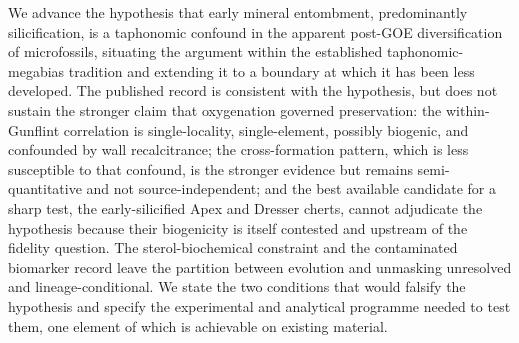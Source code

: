\documentclass[11pt]{article}
\begin{document}
We advance the hypothesis that early mineral entombment, predominantly silicification, is a
taphonomic confound in the apparent post-GOE diversification of microfossils, situating the argument
within the established taphonomic-megabias tradition and extending it to a boundary at which it has
been less developed. The published record is consistent with the hypothesis, but does not sustain the
stronger claim that oxygenation governed preservation: the within-Gunflint correlation is
single-locality, single-element, possibly biogenic, and confounded by wall recalcitrance; the
cross-formation pattern, which is less susceptible to that confound, is the stronger evidence but
remains semi-quantitative and not source-independent; and the best available candidate for a sharp
test, the early-silicified Apex and Dresser cherts, cannot adjudicate the hypothesis because their
biogenicity is itself contested and upstream of the fidelity question. The sterol-biochemical
constraint and the contaminated biomarker record leave the partition between evolution and unmasking
unresolved and lineage-conditional. We state the two conditions that would falsify the hypothesis
and specify the experimental and analytical programme needed to test them, one element of which is
achievable on existing material.
\end{document}
